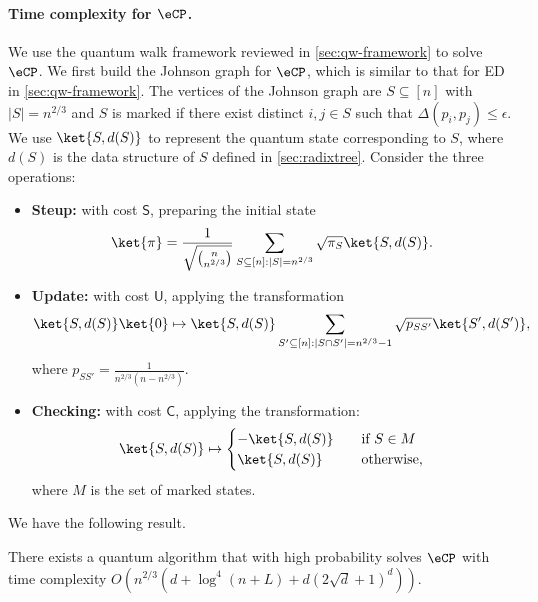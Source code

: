 \paragraph{Time complexity for $\eCP$.}
We use the quantum walk framework reviewed in \cref{sec:qw-framework} to solve $\eCP$. We first build the Johnson graph for $\eCP$, which is similar to that for \textsf{ED} in \cref{sec:qw-framework}. The vertices of the Johnson graph are $S \subseteq [n]$ with $|S| = n^{2/3}$ and $S$ is marked if there exist distinct $i, j \in S$ such that $\Delta(p_i, p_j) \leq \epsilon$. 
We use $\ket{S, d(S)}$ to represent the quantum state corresponding to $S$, where $d(S)$ is the data structure of $S$ defined in \cref{sec:radixtree}. 
Consider the three operations:
\begin{itemize}
  \item \textbf{Steup:} with cost $\mathsf{S}$,
  preparing the initial state 
    \begin{align}
      \ket{\pi} = \frac{1}{\sqrt{\binom{n}{n^{2/3}}}}\sum_{S \subseteq [n]: |S|=n^{2/3}}\sqrt{\pi_S}\ket{S, d(S)}.
    \end{align}
  \item \textbf{Update:}  with cost $\mathsf{U}$, applying the transformation 
    \begin{align}
      \ket{S, d(S)}\ket{0} \mapsto \ket{S, d(S)}\sum_{S' \subseteq[n]: |S\cap S'| = n^{2/3}-1}\sqrt{p_{SS'}}\ket{S', d(S')},
    \end{align}
    where $p_{SS'} = \frac{1}{n^{2/3}(n-n^{2/3})}$.
  \item \textbf{Checking:} with cost $\mathsf{C}$, applying the transformation: 
    \begin{align}
      \ket{S, d(S)} \mapsto \begin{cases} -\ket{S, d(S)} \quad &\text{if $S\in M$} \\ \ket{S, d(S)} \quad &\text{otherwise,}\end{cases}
    \end{align}
    where $M$ is the set of marked states.
\end{itemize}

We have the following result.
\begin{theorem}
  \label{thm:ecp1}
  There exists a quantum algorithm that with high probability solves $\eCP$ with time complexity $O(n^{2/3}(d+\log^4(n+L) + d(2\sqrt{d}+1)^d))$.
\end{theorem}

